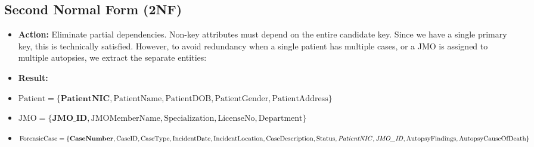 \documentclass[12pt,a4paper]{article}
\begin{document}
\subsection{Second Normal Form (2NF)}
\begin{itemize}
    \item \textbf{Action:} Eliminate partial dependencies. Non-key attributes must depend on the entire candidate key. Since we have a single primary key, this is technically satisfied. However, to avoid redundancy when a single patient has multiple cases, or a JMO is assigned to multiple autopsies, we extract the separate entities:
    \item \textbf{Result:}
\end{itemize}
\begin{itemize}
    \item $\text{Patient} = \{\textbf{PatientNIC}, \text{PatientName}, \text{PatientDOB}, \text{PatientGender}, \text{PatientAddress}\}$
    \item $\text{JMO} = \{\textbf{JMO\_ID}, \text{JMOMemberName}, \text{Specialization}, \text{LicenseNo}, \text{Department}\}$
    \item $\text{ForensicCase} = \{\textbf{CaseNumber}, \text{CaseID}, \text{CaseType}, \text{IncidentDate}, \text{IncidentLocation}, \text{CaseDescription}, \text{Status}, \text{\textit{PatientNIC}}, \text{\textit{JMO\_ID}}, \text{AutopsyFindings}, \text{AutopsyCauseOfDeath}\}$
\end{itemize}
\end{document}
